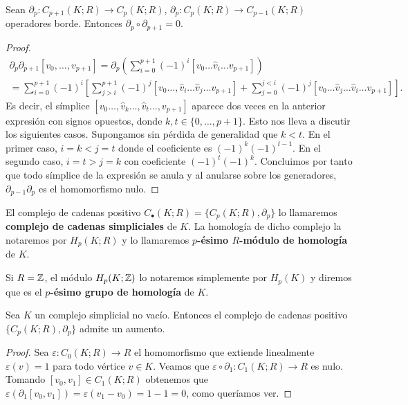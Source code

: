 \begin{lema}
	Sean $\partial_{p}: C_{p+1}(K;R) \to C_{p}(K;R)$,
	$\partial_{p}: C_{p}(K;R) \to C_{p-1}(K;R)$ operadores borde. Entonces $\partial
	_{p}\circ \partial_{p+1}= 0$.
\end{lema}
\begin{proof}
	\begin{gather*}
		\partial_{p}\partial_{p+1}[v_{0}, \ldots, v_{p+1}] = \partial_{p}\left( \sum_{i=0}
		^{p+1}(-1)^{i}[v_{0}\ldots \hat{v}_{i}\ldots v_{p+1}] \right) \\ = \sum_{i=0}
		^{p+1}(-1)^{i}\left[ \sum_{j>i}^{p+1}(-1)^{j}[v_{0}\ldots, \hat{v}_{i}\ldots
		\hat{v}_{j}\ldots v_{p+1}] + \sum_{j=0}^{j<i}(-1)^{j}[v_{0}\ldots \hat{v}_{j}
		\ldots \hat{v}_{i}\ldots v_{p+1}] \right].
	\end{gather*}
	Es decir, el símplice
	$[v_{0}\ldots,\hat{v}_{k}\ldots,\hat{v}_{t}\ldots, v_{p+1}]$ aparece dos veces
	en la anterior expresión con signos opuestos, donde $k,t \in \{0, \ldots, p+1\}$.
	Esto nos lleva a discutir los siguientes casos. Supongamos sin pérdida de generalidad
	que $k < t$. En el primer caso, $i = k < j = t$ donde el coeficiente es $(-1)^{k}
	(-1)^{t-1}$. En el segundo caso, $i = t > j = k$ con coeficiente $(-1)^{t}(-1)^{k}$.
	Concluimos por tanto que todo símplice de la expresión se anula y al anularse
	sobre los generadores, $\partial_{p-1}\partial_{p}$ es el homomorfismo nulo.
\end{proof}

\begin{definicion}
	El complejo de cadenas positivo $C_{\bullet}(K;R) = \{C_{p}(K;R), \partial_{p}\}$
	lo llamaremos \textbf{complejo de cadenas simpliciales} de $K$. La homología de
	dicho complejo la notaremos por $H_{p}(K;R)$ y lo llamaremos \textbf{$p$-ésimo
		$R$-módulo de homología} de $K$.
\end{definicion}
Si $R=\mathbb{Z}$, el módulo $H_{p}(K;\mathbb{Z})$ lo notaremos simplemente por $H_{p}(K)$ y diremos
que es el \textbf{$p$-ésimo grupo de homología} de $K$.

\begin{proposicion}
	\label{prop:aumento} Sea $K$ un complejo simplicial no vacío. Entonces el
	complejo de cadenas positivo $\{ C_{p}(K;R), \partial_{p}\}$ admite un aumento.
\end{proposicion}
\begin{proof}
	Sea $\varepsilon: C_{0}(K;R) \to R$ el homomorfismo que extiende linealmente $\varepsilon
	(v) = 1$ para todo vértice $v \in K$. Veamos que
	$\varepsilon \circ \partial_{1}: C_{1}(K;R) \to R$ es nulo. Tomando $[v_{0},v_{1}
	] \in C_{1}(K;R)$ obtenemos que $\varepsilon (\partial_{1}[v_{0},v_{1}]) = \varepsilon
	(v_{1}- v_{0}) = 1-1 = 0$, como queríamos ver.
\end{proof}

